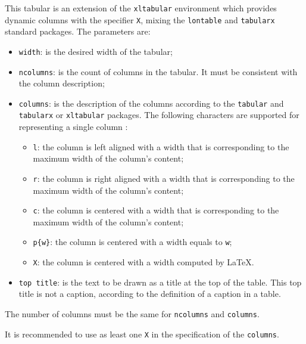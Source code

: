 \documentclass[book,taskpackage,specpackage,codepackage]{upmethodology-document}
\begin{document}
This tabular is an extension of the \texttt{xltabular} environment which provides dynamic columns with the specifier \texttt{X}, mixing the \texttt{lontable} and \texttt{tabularx} standard packages. The parameters are:
\begin{itemize}
\item \texttt{width}: is the desired width of the tabular;

\item \texttt{ncolumns}: is the count of columns in the tabular. It must be consistent with the column description;

\item \texttt{columns}: is the description of the columns according to the \texttt{tabular} and \texttt{tabularx} or \texttt{xltabular} packages. The following characters are supported for representing a single column :
	\begin{itemize}
	\item \texttt{l}: the column is left aligned with a width that is corresponding to the maximum width of the column's content;
	\item \texttt{r}: the column is right aligned with a width that is corresponding to the maximum width of the column's content;
	\item \texttt{c}: the column is centered with a width that is corresponding to the maximum width of the column's content;
	\item \texttt{p\{w\}}: the column is centered with a width equals to \texttt{w};
	\item \texttt{X}: the column is centered with a width computed by \LaTeX.
	\end{itemize}

\item \texttt{top title}: is the text to be drawn as a title at the top of the table. This top title is not a caption, according to the definition of a caption in a table.

\end{itemize}

\begin{upmcaution}
	The number of columns must be the same for \texttt{ncolumns} and \texttt{columns}.
\end{upmcaution}

\begin{upmnote}
	It is recommended to use as least one \texttt{X} in the specification of the \texttt{columns}.
\end{upmnote}
\end{document}
